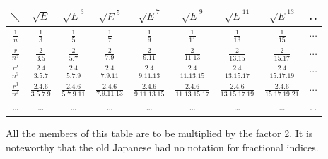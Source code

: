 \documentclass[11pt]{article}
\begin{document}
\begin{center}
\renewcommand{\arraystretch}{2.2}\setlength{\tabcolsep}{4pt}
\begin{tabular}{|c||c|c|c|c|c|c|c|c|}
\hline
$\diagdown$ & $\sqrt{E}$ & $\sqrt{E}^{3}$ & $\sqrt{E}^{5}$ & $\sqrt{E}^{7}$ & $\sqrt{E}^{9}$ & $\sqrt{E}^{11}$ & $\sqrt{E}^{13}$ & .\,.\\
\hline\hline
$\frac{1}{n}$ & $\frac{1}{3}$ & $\frac{1}{5}$ & $\frac{1}{7}$ & $\frac{1}{9}$ & $\frac{1}{11}$ & $\frac{1}{13}$ & $\frac{1}{15}$ & $\cdots$\\
\hline
$\frac{r}{n^2}$ & $\frac{2}{3.5}$ & $\frac{2}{5.7}$ & $\frac{2}{7.9}$ & $\frac{2}{9.11}$ & $\frac{2}{11\;13}$ & $\frac{2}{13.15}$ & $\frac{2}{15.17}$ & $\cdots$\\
\hline
$\frac{r^2}{n^3}$ & $\frac{2.4}{3.5.7}$ & $\frac{2.4}{5.7.9}$ & $\frac{2.4}{7.9.11}$ & $\frac{2.4}{9.11.13}$ & $\frac{2.4}{11.13.15}$ & $\frac{2.4}{13.15.17}$ & $\frac{2.4}{15.17.19}$ & $\cdots$\\
\hline
$\frac{r^3}{n^4}$ & $\frac{2.4.6}{3.5.7.9}$ & $\frac{2.4.6}{5.7.9.11}$ & $\frac{2.4.6}{7.9.11.13}$ & $\frac{2.4.6}{9.11.13.15}$ & $\frac{2.4.6}{11.13.15.17}$ & $\frac{2.4.6}{13.15.17.19}$ & $\frac{2.4.6}{15.17.19.21}$ & $\cdots$\\
\hline
\dots & \dots & \dots & \dots & \dots & \dots & \dots & \dots & .\,.\\
\hline
\end{tabular}
\end{center}

All the members of this table are to be multiplied by the factor 2. It is noteworthy that the old Japanese had no notation for fractional indices.
\end{document}
